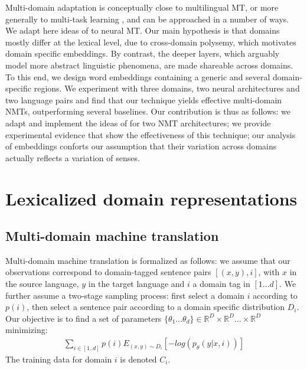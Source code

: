 \documentclass[11pt,a4paper]{article}
\newcommand{\fyDone}[1]{\done[FY]\Todo[FY:]{\textcolor{orange}{#1}}}
\begin{document}
Multi-domain adaptation is conceptually close to multilingual MT, or more generally to multi-task learning \cite{Caruana97multitask}, and can be approached in a number of ways. We adapt here ideas of \citet{Daume07frustratingly} to neural MT.
Our main hypothesis is that domains mostly differ at the lexical level, due to cross-domain polysemy, which motivates domain specific embeddings. By contrast, the deeper layers, which arguably model more abstract linguistic phenomena, are made shareable across domains. To this end, we design word embeddings containing a generic and several domain-specific regions. We experiment with three domains, two neural architectures and two language pairs and find that our technique yields effective multi-domain NMTs, outperforming several baselines. Our contribution is thus as follows:
we adapt and implement the ideas of \cite{Daume07frustratingly} for two NMT architectures;
we provide experimental evidence that show the effectiveness of this technique;
our analysis of embeddings conforts our assumption that their variation across domains actually reflects a variation of senses.
\fyDone{can we train in random order ? can we get away with catastrophic forgetting ?}
\fyDone{how to analyze the embeddings ? how can we test or claim ?}

\section{Lexicalized domain representations\label{sec:lexicalized_embeddings}}
\fyDone{Use meaningful titles throughout}

\subsection{Multi-domain machine translation \label{ssec:statement}}

Multi-domain machine translation is formalized as follows: we assume that our observations correspond to  domain-tagged sentence pairs $[(x,y),i]$, with $x$ in the source language, $y$ in the target language and $i$ a domain tag in $[1\dots d]$. We further assume a two-stage sampling process: first select a domain $i$ according to $p(i)$, then select a sentence pair according to a domain specific distribution $D_i$. Our objective is to find a set of parameters $\{\theta_1 \dots \theta_d \} \in \mathbb{R}^D \times \mathbb{R}^D \dots \times \mathbb{R}^D$ minimizing:
\begin{equation} \label{eq:loss}
\begin{split}
\sum_{i \in [1..d]} p(i) E_{(x,y) \sim D_{i}} [-log(p_{\theta}(y|x,i))]
\end{split}
\end{equation}
The training data for domain $i$ is denoted $C_i$.
\end{document}
